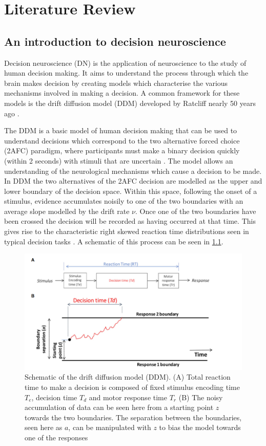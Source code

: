 \chapter{Literature Review}

\section{An introduction to decision neuroscience}
Decision neuroscience (DN) is the application of neuroscience to the study of human decision making. It aims to understand the process through which the brain makes decision by creating models which characterise the various mechanisms involved in making a decision. A common framework for these models is the drift diffusion model (DDM) developed by Ratcliff nearly 50 years ago \cite{ratcliffTheoryMemoryRetrieval1978}.


The DDM is a basic model of human decision making that can be used to understand decisions which correspond to the two alternative forced choice (2AFC) paradigm, where participants must make a binary decision quickly (within 2 seconds) with stimuli that are uncertain \cite{ratcliffDiffusionDecisionModel2008, myersPracticalIntroductionUsing2022}. The model allows an understanding of the neurological mechanisms which cause a decision to be made. In DDM the two alternatives of the 2AFC decision are modelled as the upper and lower boundary of the decision space. Within this space, following the onset of a stimulus, evidence accumulates noisily to one of the two boundaries with an average slope modelled by the drift rate $\nu$. Once one of the two boundaries have been crossed the decision will be recorded as having occurred at that time. This gives rise to the characteristic right skewed reaction time distributions seen in typical decision tasks \cite{ratcliffTheoryMemoryRetrieval1978}. A schematic of this process can be seen in \ref{fig:DDM plot}.
\begin{figure}
    \centering
    \includegraphics[width=0.75\linewidth]{figures/DDM.PNG}
    \caption{Schematic of the drift diffusion model (DDM). (A) Total reaction time to make a decision is composed of fixed stimulus encoding time $T_{e}$, decision time $T_{d}$ and motor response time $T_{r}$ (B) The noisy accumulation of data can be seen here from a starting point $z$ towards the two boundaries. The separation between the boundaries, seen here as $a$, can be manipulated with $z$ to bias the model towards one of the responses \cite{myersPracticalIntroductionUsing2022}}
    \label{fig:DDM plot}
\end{figure}

